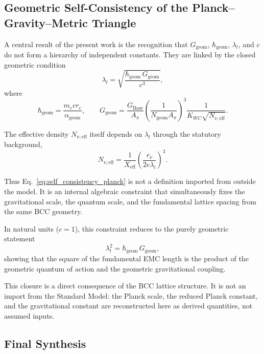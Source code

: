\documentclass[10pt,a4paper]{article}
\begin{document}
\subsection{Geometric Self-Consistency of the Planck--Gravity--Metric Triangle}
\label{sec:geometric_self_consistency}

A central result of the present work is the recognition that
\(G_{\text{geom}}\), \(\hbar_{\text{geom}}\), \(\lambda_l\), and \(c\)
do not form a hierarchy of independent constants. They are linked by the
closed geometric condition
\begin{equation}
	\lambda_l
	=
	\sqrt{\frac{\hbar_{\text{geom}}\,G_{\text{geom}}}{c^3}},
	\label{eq:self_consistency_planck}
\end{equation}
where
\begin{equation}
	\hbar_{\text{geom}}
	=
	\frac{m_e c r_e}{\alpha_{\text{geom}}},
	\qquad
	G_{\text{geom}}
	=
	\frac{G_{\text{Base}}}{A_\pi}
	\left(
	\frac{1}{N_{\text{geom}} A_\pi}
	\right)^3
	\frac{1}{K_{WC}\sqrt{N_{\nu,\text{eff}}}} .
\end{equation}

The effective density \(N_{\nu,\text{eff}}\) itself depends on
\(\lambda_l\) through the statutory background,
\begin{equation}
	N_{\nu,\text{eff}}
	=
	\frac{1}{X_{\text{eff}}}
	\left(
	\frac{r_\nu}{2 e \lambda_l}
	\right)^3 .
\end{equation}

Thus Eq.~\eqref{eq:self_consistency_planck} is not a definition imported
from outside the model. It is an internal algebraic constraint that
simultaneously fixes the gravitational scale, the quantum scale, and the
fundamental lattice spacing from the same BCC geometry.

In natural units (\(c=1\)), this constraint reduces to the purely
geometric statement
\begin{equation}
	\lambda_l^2
	=
	\hbar_{\text{geom}}\,G_{\text{geom}},
\end{equation}
showing that the square of the fundamental EMC length is the product of the
geometric quantum of action and the geometric gravitational coupling.

This closure is a direct consequence of the BCC lattice structure. It is
not an import from the Standard Model: the Planck scale, the reduced Planck
constant, and the gravitational constant are reconstructed here as derived
quantities, not assumed inputs.

\subsection{Final Synthesis}
\label{sec:final_synthesis}
\end{document}
